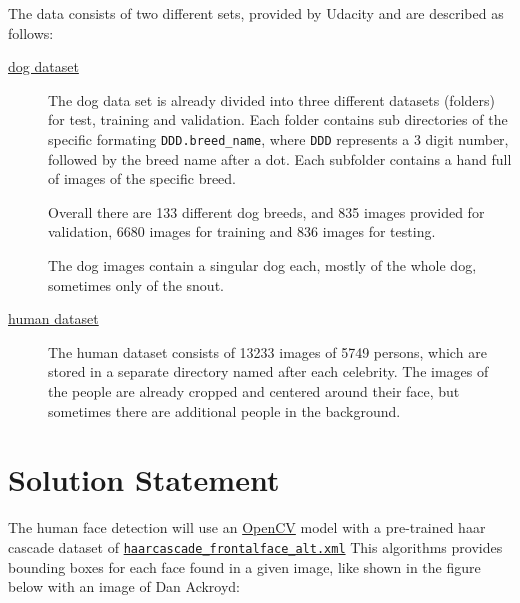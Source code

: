 \documentclass[paper=A4, DIV=11, parskip=half]{scrartcl}
\begin{document}
The data consists of two different sets, provided by Udacity and are described as follows:

\begin{description}
  \item[\href{https://s3-us-west-1.amazonaws.com/udacity-aind/dog-project/dogImages.zip}{dog dataset}]
  The dog data set is already divided into three different datasets (folders)
  for test, training and validation. Each folder contains sub directories of the specific
  formating \texttt{DDD.breed\_name}, where \texttt{DDD} represents a 3 digit number,
  followed by the breed name after a dot. Each subfolder contains a hand full of images of
  the specific breed.
  
  Overall there are 133 different dog breeds, and 835 images provided for validation, 6680
  images for training and 836 images for testing.
  
  The dog images contain a singular dog each, mostly of the whole dog, sometimes only of
  the snout.
  
  \item[\href{https://s3-us-west-1.amazonaws.com/udacity-aind/dog-project/lfw.zip}{human dataset}]
  The human dataset consists of 13233 images of 5749 persons, which are stored in a
  separate directory named after each  celebrity. The images of the people are already
  cropped and centered around their face, but sometimes there are additional people in the
  background.
\end{description}


\section*{Solution Statement}

The human face detection will use an \href{https://opencv.org/}{OpenCV} model with a
pre-trained haar cascade dataset of
\href{https://github.com/opencv/opencv/blob/master/data/haarcascades/haarcascade_frontalface_alt.xml}{\texttt{haarcascade\_frontalface\_alt.xml}}
This algorithms provides bounding boxes for each face found in a given image, like shown
in the figure below with an image of Dan Ackroyd:
\end{document}

